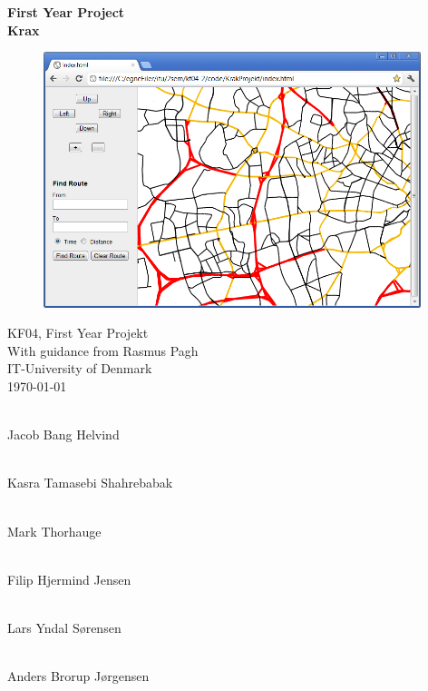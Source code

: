 \documentclass[a4paper,10pt,titlepage]{article}
\begin{document}
	\thispagestyle{empty} %
\begin{center}
\textbf{\Huge {First Year Project}\\ \vspace{1cm}
\huge{Krax}}
\vspace{1.0cm}
\end{center}
	\begin{figure}[H]
\includegraphics[width=110mm]{screendump.png}
\centering
\label{fig:screendump}
\end{figure}
\vspace{1.0cm}
KF04, First Year Projekt\\
With guidance from Rasmus Pagh\\
IT-University of Denmark\\
\today\\
\vspace{0.4cm}
\begin{center}
 \hspace{0.5cm} \makebox[3.0in]{\hrulefill}\\
 \scriptsize Jacob Bang Helvind
 \vspace{0.3cm}

 \hspace{0.5cm} \makebox[3.0in]{\hrulefill}\\
 Kasra Tamasebi Shahrebabak
  \vspace{0.4cm}

 \hspace{0.5cm} \makebox[3.0in]{\hrulefill}\\
 Mark Thorhauge
  \vspace{0.4cm}

 \hspace{0.5cm} \makebox[3.0in]{\hrulefill}\\
  Filip Hjermind Jensen
   \vspace{0.4cm}

\hspace{0.5cm} \makebox[3.0in]{\hrulefill}\\
Lars Yndal S\o rensen
 \vspace{0.4cm}

\hspace{0.5cm} \makebox[3.0in]{\hrulefill}\\
Anders Brorup J\o rgensen 
\vspace{0.4cm}

\end{center}
\end{document}
